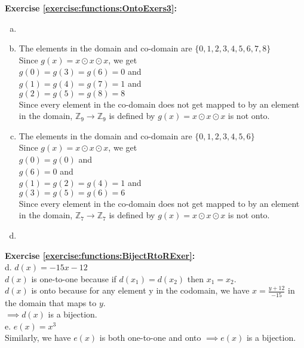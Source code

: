\noindent\textbf{Exercise \ref{exercise:functions:OntoExers3}:} %
\begin{enumerate}[(a)]
\item \label{modular_m3}

\item 
The elements in the domain and co-domain are $\{0,1,2,3,4,5,6,7,8\}$\\
Since $g(x)=x\odot x\odot x$, we get\\
$g(0)=g(3)=g(6)=0$ and\\ 
$g(1)=g(4)=g(7)=1$ and\\ 
$g(2)=g(5)=g(8)=8$\\        
Since every element in the co-domain does not get mapped to by an element in the domain, $\mathbb{Z}_{9}\to \mathbb{Z}_{9}$ is defined by $g(x)=x\odot x\odot x$ is not onto.

\item 
The elements in the domain and co-domain are $\{0,1,2,3,4,5,6\}$\\
Since $g(x)=x\odot x\odot x$, we get\\
$g(0)=g(0)$ and\\ 
$g(6)=0$ and\\ 
$g(1)=g(2)=g(4)=1$ and\\ 
$g(3)=g(5)=g(6)=6$\\
Since every element in the co-domain does not get mapped to by an element in the domain, $\mathbb{Z}_{7}\to \mathbb{Z}_{7}$ is defined by $g(x)=x\odot x\odot x$ is not onto.

\item 

\end{enumerate}



\noindent\textbf{Exercise \ref{exercise:functions:BijectRtoRExer}:}\\
d. $d(x)=-15x-12$\\
$d(x)$ is one-to-one because if $d(x_1)=d(x_2)$ then $x_1=x_2$.\\
$d(x)$ is onto because for any element y in the codomain, we have $x=\displaystyle\frac{y+12}{-15}$ in the domain that maps to $y$.\\
$\implies d(x)$ is a bijection.\\
e. $e(x)=x^3$\\
Similarly, we have $e(x)$ is both one-to-one and onto $\implies e(x)$ is a bijection.\\

